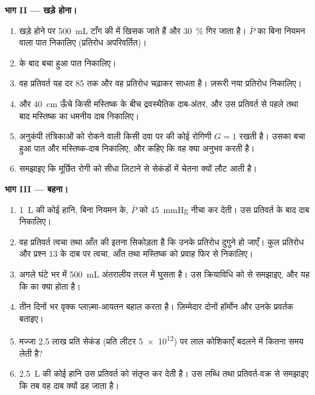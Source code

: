 \begin{problem}
\medskip
\noindent\textbf{भाग II --- खड़े होना।}
\begin{enumerate}[resume]
  \item खड़े होने पर \qty{500}{mL} टाँग की  में खिसक जाते हैं और
         \qty{30}{\%} गिर जाता है। $\bar P$ का बिना नियमन वाला
        पात निकालिए (प्रतिरोध अपरिवर्तित)।
  \item {} के बाद बचा हुआ पात निकालिए।
  \item वह प्रतिवर्त यह दर 85 तक और वह प्रतिरोध चढ़ाकर साधता है।
        ज़रूरी नया प्रतिरोध निकालिए।
  \item {} और \qty{40}{cm} ऊँचे किसी मस्तिष्क के बीच
        द्रवस्थैतिक दाब-अंतर, और उस प्रतिवर्त से पहले तथा बाद
        मस्तिष्क का धमनीय दाब निकालिए।
  \item अनुकंपी तंत्रिकाओं को रोकने वाली किसी दवा पर की कोई रोगिणी
        $G = 1$ रखती है। उसका बचा हुआ पात और मस्तिष्क-दाब निकालिए,
        और कहिए कि वह क्या अनुभव करती है।
  \item समझाइए कि मूर्छित रोगी को सीधा लिटाने से सेकंडों में चेतना क्यों
        लौट आती है।
\end{enumerate}

\medskip
\noindent\textbf{भाग III ---  बहना।}
\begin{enumerate}[resume]
  \item \qty{1}{L} की कोई हानि, बिना नियमन के, $\bar P$ को
        \qty{45}{mmHg} नीचा कर देती। उस प्रतिवर्त के बाद दाब निकालिए।
  \item वह प्रतिवर्त त्वचा तथा आँत की  इतना सिकोड़ता है कि
        उनके प्रतिरोध दुगुने हो जाएँ। कुल प्रतिरोध और
        प्रश्न 13 के दाब पर त्वचा, आँत तथा मस्तिष्क को प्रवाह
        फिर से निकालिए।
  \item अगले घंटे भर में \qty{500}{mL} अंतरालीय तरल
         में घुसता है। उस क्रियाविधि को  से
        समझाइए, और यह कि  का क्या होता है।
  \item तीन दिनों भर वृक्क प्लाज़्मा-आयतन बहाल करता है।
        ज़िम्मेदार दोनों हॉर्मोन और उनके प्रवर्तक बताइए।
  \item मज्जा \num{2.5} लाख प्रति सेकंड (प्रति लीटर \num{5e12}) पर
        लाल कोशिकाएँ बदलने में कितना समय लेती है?
  \item \qty{2.5}{L} की कोई हानि उस प्रतिवर्त को संतृप्त कर देती है। उस
        लब्धि तथा प्रतिवर्त-वक्र से समझाइए कि तब वह दाब क्यों ढह जाता है।
\end{enumerate}


\end{problem}
